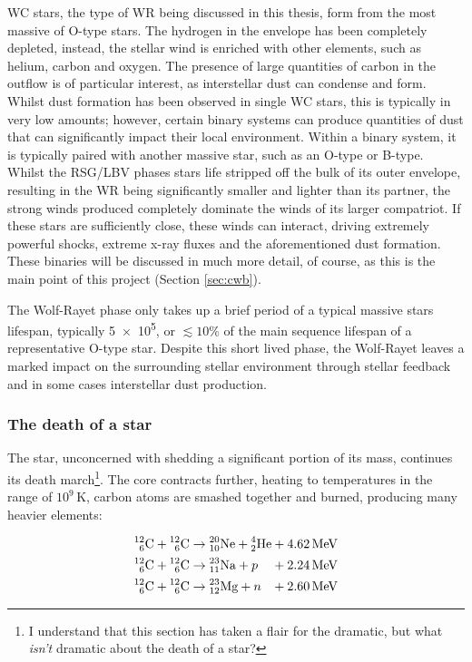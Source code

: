 \noindent
WC stars, the type of WR being discussed in this thesis, form from the most massive of O-type stars.
The hydrogen in the envelope has been completely depleted, instead, the stellar wind is enriched with other elements, such as helium, carbon and oxygen.
The presence of large quantities of carbon in the outflow is of particular interest, as interstellar dust can condense and form.
Whilst dust formation has been observed in single WC stars, this is typically in very low amounts; however, certain binary systems can produce quantities of dust that can significantly impact their local environment.
Within a binary system, it is typically paired with another massive star, such as an O-type or B-type.
Whilst the RSG/LBV phases stars life stripped off the bulk of its outer envelope, resulting in the WR being significantly smaller and lighter than its partner, the strong winds produced completely dominate the winds of its larger compatriot.
If these stars are sufficiently close, these winds can interact, driving extremely powerful shocks, extreme x-ray fluxes and the aforementioned dust formation.
These binaries will be discussed in much more detail, of course, as this is the main point of this project (Section \ref{sec:cwb}).

The Wolf-Rayet phase only takes up a brief period of a typical massive stars lifespan, typically \SI{5e5}{\year}, or $\lesssim 10\%$ of the main sequence lifespan of a representative O-type star.
Despite this short lived phase, the Wolf-Rayet leaves a marked impact on the surrounding stellar environment through stellar feedback and in some cases interstellar dust production.

\subsubsection{The death of a star}

The star, unconcerned with shedding a significant portion of its mass, continues its death march\footnote{I understand that this section has taken a flair for the dramatic, but what \emph{isn't} dramatic about the death of a star?}.
The core contracts further, heating to temperatures in the range of $10^9 \, \si{\kelvin}$, carbon atoms are smashed together and burned, producing many heavier elements:

\begin{equation}
  \begin{alignedat}{3}
    \atom{C}{12}{6} + \atom{C}{12}{6} & \rightarrow \atom{Ne}{20}{10} + \atom{He}{4}{2} && + \SI{4.62}{\mega\electronvolt} \\
    \atom{C}{12}{6} + \atom{C}{12}{6} & \rightarrow \atom{Na}{23}{11} + p && + \SI{2.24}{\mega\electronvolt} \\
    \atom{C}{12}{6} + \atom{C}{12}{6} & \rightarrow \atom{Mg}{23}{12} + n && + \SI{2.60}{\mega\electronvolt}
  \end{alignedat}
\end{equation}

